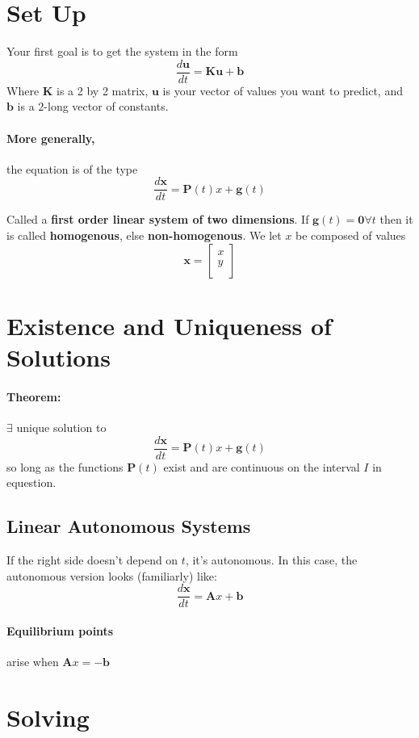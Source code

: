 \documentclass[a4paper,12pt]{report}
\begin{document}
\section{Set Up}
Your first goal is to get the system in the form $$\frac{d \pmb{u}}{dt} = \pmb{Ku + b}$$
Where $\pmb{K}$ is a 2 by 2 matrix, $\pmb{u}$ is your vector of values you want to 
predict, and $\pmb{b}$ is a $2$-long vector of constants.

\paragraph{More generally, } the equation is of the type 
$$\frac{d\pmb{x}}{dt} = \pmb{P}(t)x + \pmb{g}(t)$$

Called a \textbf{first order linear system of two dimensions}. If $\pmb{g}(t) = \pmb{0} \forall t$ 
then it is called \textbf{homogenous}, else \textbf{non-homogenous}. We let $x$ be composed
of values $$\pmb{x} = \begin{bmatrix}
                           x \\
                           y \\
                      \end{bmatrix}$$

\section{Existence and Uniqueness of Solutions}
\paragraph{Theorem: } $\exists$ unique solution to $$\frac{d\pmb{x}}{dt} = \pmb{P}(t)x + \pmb{g}(t)$$ 
so long as the functions $\pmb{P}(t)$ exist and are continuous on the interval $I$ in equestion.

\subsection{Linear Autonomous Systems}
If the right side doesn't depend on $t$, it's autonomous. In this case, the autonomous 
version looks (familiarly) like: $$\frac{d\pmb{x}}{dt} = \pmb{A}x + \pmb{b}$$

\paragraph{Equilibrium points} arise when $\pmb{A}x = -\pmb{b}$

\section{Solving}
\end{document}
